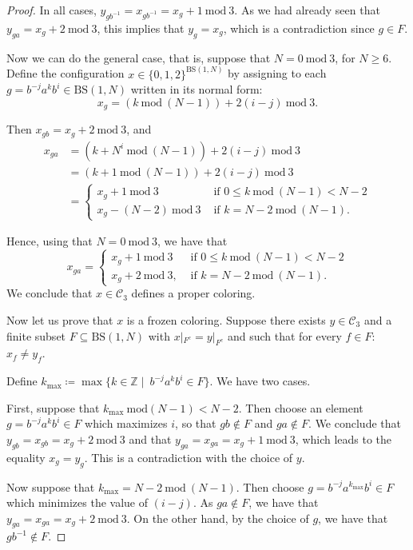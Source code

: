 \documentclass[cupthm,crop,info]{CUP-JNL-ETS}%
\theoremstyle{cupplain}
\theoremstyle{cupdefinition}
\theoremstyle{cupremark}
\theoremstyle{cupproof}
\newtheorem{proof}{Proof}
\numberwithin{equation}{section}
\newcommand{\BS}[1][N]{\mathrm{BS}(1,#1)}
\begin{document}
\begin{proof}
In all cases, $y_{gb^{-1}}=x_{gb^{-1}}=x_{g}+1\ \mathrm{mod} \ 3$. As we had already seen that $y_{ga}=x_{g}+2\ \mathrm{mod}\ 3$, this implies that $y_g=x_g$, which is a contradiction since $g\in F$.



Now we can do the general case, that is, suppose that $N=0 \ \mathrm{mod} \ 3$, for $N \ge 6$. Define the configuration $x\in \{0,1,2\}^{\BS}$ by assigning to each $g=b^{-j}a^kb^{i}\in \BS$ written in its normal form:
$$
x_g=(k\ \mathrm{mod}\ (N-1))+ 2(i-j)\ \mathrm{mod}\  3.
$$ 
	
	Then $x_{gb}=x_g+2 \ \mathrm{mod} \ 3$, and
\begin{align*}
x_{ga}&=(k+N^i \ \mathrm{mod}\ (N-1))+2(i-j)\ \mathrm{mod}\ 3\\
&=(k+1 \ \mathrm{mod}\ (N-1))+2(i-j)\ \mathrm{mod}\ 3\\
&=\left\{
\begin{aligned}
x_g+1 \ \mathrm{mod}\ 3 &\text{ if } 0\le k\ \mathrm{mod}\ (N-1) <N-2\\
x_g-(N-2) \ \mathrm{mod}\ 3 &\text{ if }  k=N-2 \ \mathrm{mod}\ (N-1).
\end{aligned}
\right.
\end{align*}	

Hence, using that $N=0\ \mathrm{mod}\ 3$, we have that
$$
x_{ga}=\begin{cases}
x_g+1 \ \mathrm{mod} \ 3&\text{ if } 0\le k\ \mathrm{mod}\ (N-1) <N-2\\
x_{g}+2 \ \mathrm{mod} \ 3, &\text{ if }k=N-2 \ \mathrm{mod}\ (N-1).
\end{cases}
$$	
We conclude that $x\in \mathcal{C}_3$ defines a proper coloring.

Now let us prove that $x$ is a frozen coloring. Suppose there exists $y\in \mathcal{C}_3$ and a finite subset $F\subseteq\BS$ with $x|_{F^{c}}=y|_{F^c}$ and such that for every $f\in F$: $x_f\neq y_f$.

Define $k_{\mathrm{max}}\coloneqq \max\{k\in \mathbb{Z}\mid \ b^{-j}a^kb^i\in F \}$. We have two cases.

First, suppose that $k_{\mathrm{max}} \ \mathrm{mod} (N-1)<N-2$. Then choose an element $g=b^{-j}a^kb^i\in F$ which maximizes $i$, so that $gb\notin F$ and $ga\notin F$. We conclude that $y_{gb}=x_{gb}=x_g+2\ \mathrm{mod}\ 3$ and that $y_{ga}=x_{ga}=x_g+1\ \mathrm{mod}\ 3$, which leads to the  equality $x_g=y_g$. This is a contradiction with the choice of $y$.

Now suppose that $k_{\mathrm{max}}=N-2\ \mathrm{mod}\ (N-1)$. Then choose $g=b^{-j}a^{k_{\mathrm{max}}}b^i\in F$ which minimizes the value of $(i-j)$. As $ga\notin F$, we have that $y_{ga}=x_{ga}=x_g+2\ \mathrm{mod}\ 3$. On the other hand, by the choice of $g$, we have that $gb^{-1}\notin F$.


\end{proof}
\end{document}

